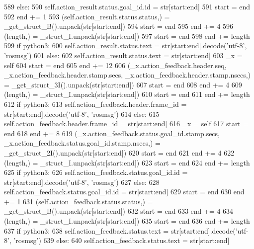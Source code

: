 \begin{DoxyCode}
589       \textcolor{keywordflow}{else}:
590         self.action\_result.status.goal\_id.id = str[start:end]
591       start = end
592       end += 1
593       (self.action\_result.status.status,) = \_get\_struct\_B().unpack(str[start:end])
594       start = end
595       end += 4
596       (length,) = \_struct\_I.unpack(str[start:end])
597       start = end
598       end += length
599       \textcolor{keywordflow}{if} python3:
600         self.action\_result.status.text = str[start:end].decode(\textcolor{stringliteral}{'utf-8'}, \textcolor{stringliteral}{'rosmsg'})
601       \textcolor{keywordflow}{else}:
602         self.action\_result.status.text = str[start:end]
603       \_x = self
604       start = end
605       end += 12
606       (\_x.action\_feedback.header.seq, \_x.action\_feedback.header.stamp.secs, 
      \_x.action\_feedback.header.stamp.nsecs,) = \_get\_struct\_3I().unpack(str[start:end])
607       start = end
608       end += 4
609       (length,) = \_struct\_I.unpack(str[start:end])
610       start = end
611       end += length
612       \textcolor{keywordflow}{if} python3:
613         self.action\_feedback.header.frame\_id = str[start:end].decode(\textcolor{stringliteral}{'utf-8'}, \textcolor{stringliteral}{'rosmsg'})
614       \textcolor{keywordflow}{else}:
615         self.action\_feedback.header.frame\_id = str[start:end]
616       \_x = self
617       start = end
618       end += 8
619       (\_x.action\_feedback.status.goal\_id.stamp.secs, \_x.action\_feedback.status.goal\_id.stamp.nsecs,) = 
      \_get\_struct\_2I().unpack(str[start:end])
620       start = end
621       end += 4
622       (length,) = \_struct\_I.unpack(str[start:end])
623       start = end
624       end += length
625       \textcolor{keywordflow}{if} python3:
626         self.action\_feedback.status.goal\_id.id = str[start:end].decode(\textcolor{stringliteral}{'utf-8'}, \textcolor{stringliteral}{'rosmsg'})
627       \textcolor{keywordflow}{else}:
628         self.action\_feedback.status.goal\_id.id = str[start:end]
629       start = end
630       end += 1
631       (self.action\_feedback.status.status,) = \_get\_struct\_B().unpack(str[start:end])
632       start = end
633       end += 4
634       (length,) = \_struct\_I.unpack(str[start:end])
635       start = end
636       end += length
637       \textcolor{keywordflow}{if} python3:
638         self.action\_feedback.status.text = str[start:end].decode(\textcolor{stringliteral}{'utf-8'}, \textcolor{stringliteral}{'rosmsg'})
639       \textcolor{keywordflow}{else}:
640         self.action\_feedback.status.text = str[start:end]

\end{DoxyCode}
